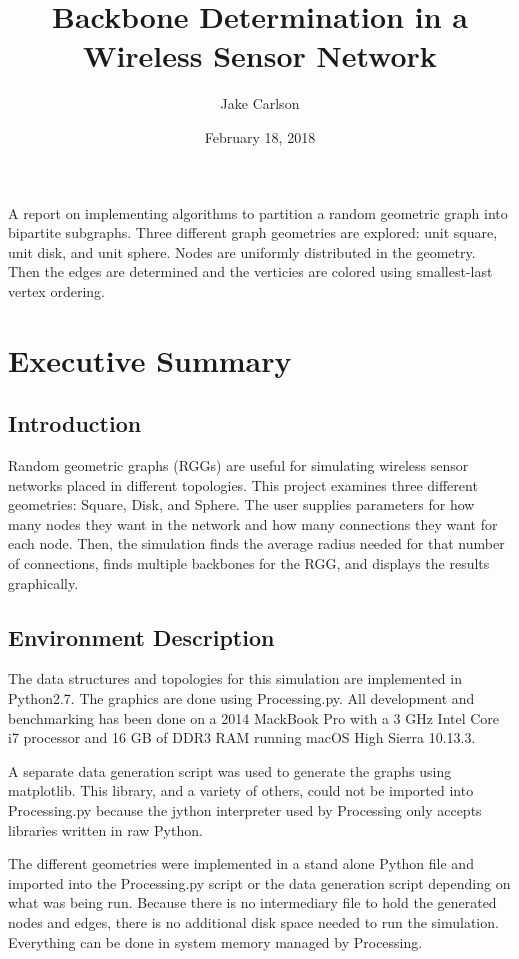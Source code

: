 \documentclass{article}
\begin{document}
\title{Backbone Determination in a Wireless Sensor Network}
\author{Jake Carlson}
\date{February 18, 2018}
\maketitle

\abstract
A report on implementing algorithms to partition a random geometric graph into bipartite subgraphs. Three different graph geometries are explored: unit square, unit disk, and unit sphere. Nodes are uniformly distributed in the geometry. Then the edges are determined and the verticies are colored using smallest-last vertex ordering.
\newpage

\tableofcontents
\lstlistoflistings
\newpage

\section{Executive Summary}

    \subsection{Introduction}
    Random geometric graphs (RGGs) are useful for simulating wireless sensor networks placed in different topologies. This project examines three different geometries: Square, Disk, and Sphere. The user supplies parameters for how many nodes they want in the network and how many connections they want for each node. Then, the simulation finds the average radius needed for that number of connections, finds multiple backbones for the RGG, and displays the results graphically.

    \subsection{Environment Description}
    The data structures and topologies for this simulation are implemented in Python2.7. The graphics are done using Processing.py. All development and benchmarking has been done on a 2014 MackBook Pro with a 3 GHz Intel Core i7 processor and 16 GB of DDR3 RAM running macOS High Sierra 10.13.3.
    \par
    A separate data generation script was used to generate the graphs using matplotlib. This library, and a variety of others, could not be imported into Processing.py because the jython interpreter used by Processing only accepts libraries written in raw Python.
    \par
    The different geometries were implemented in a stand alone Python file and imported into the Processing.py script or the data generation script depending on what was being run. Because there is no intermediary file to hold the generated nodes and edges, there is no additional disk space needed to run the simulation. Everything can be done in system memory managed by Processing.
\end{document}
